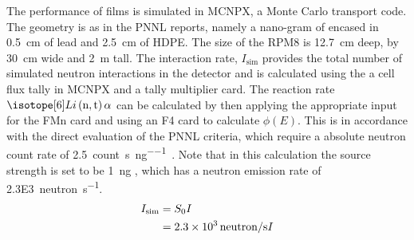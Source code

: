 The performance of films is simulated in MCNPX, a Monte Carlo transport code\cite{pelowitz_mcnpx_????}.
The geometry is as in the PNNL reports, namely a nano-gram of   encased in \SI{0.5}{\cm} of lead and \SI{2.5}{\cm} of HDPE. 
The size of the RPM8 is \SI{12.7}{\cm} deep, by \SI{30}{\cm} wide and \SI{2}{\m} tall.
The interaction rate, $I_{\text{sim}}$ provides the total number of simulated neutron interactions in the detector and is calculated using the a cell flux tally in MCNPX and a tally multiplier card.
The reaction rate $\iso[6]{Li}\left(\text{n},\text{t}\right)\alpha$ can be calculated by then applying the appropriate input for the FMn card and using an F4 card to calculate $\phi(E)$.
This is in accordance with the direct evaluation of the PNNL criteria, which require a absolute neutron count rate of \SI{2.5}{count\per\second\per\nano\gram{}}.
Note that in this calculation the source strength is set to be \SI{1}{\nano\gram} , which has a neutron emission rate of \SI{2.3E3}{neutron\per\second}.
\begin{align}
  \label{eqn:RPM8InteractionRate}
  I_{\text{sim}} &= S_0 I \\
  &= \SI{2.3E3}{neutron\per\second} I
\end{align}

